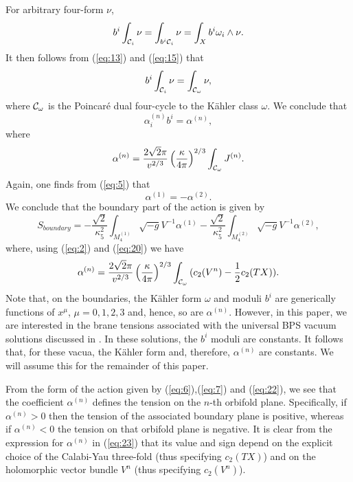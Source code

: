 \documentclass[a4paper,12pt]{article}
\numberwithin{equation}{section}
\theoremstyle{plain}
\begin{document}
For arbitrary four-form $\nu$,
%
\begin{equation}
b^{i}\int_{{\cal{C}}_{i}}{\nu}=\int_{b^{i}{\cal{C}}_{i}}{\nu}=\int_{X}{b^{i}
\omega_{i}\wedge \nu}.
\label{eq:17}
\end{equation}
%
It then follows from (\ref{eq:13}) and (\ref{eq:15}) that
%
\begin{equation}
b^{i}\int_{{\cal{C}}_{i}}{\nu}=\int_{{\cal{C}}_{\omega}}{\nu},
\label{eq:18}
\end{equation}
%
where ${\cal{C}}_{\omega}$ is the Poincar\'e dual four-cycle to the K\"{a}hler
class $\omega$. We conclude that
%
\begin{equation}
\alpha_{i}^{(n)}b^{i}=\alpha^{(n)},
\label{eq:19}
\end{equation}
%
where
%
\begin{equation}
\alpha^{(n)}=\frac{2\sqrt{2}\pi}{v^{2/3}}\left(\frac{\kappa}{4\pi}\right)^{2/3}
\int_{{\cal{C}}_{\omega}}{J^{(n)}}.
\label{eq:20}
\end{equation}
%
Again, one finds from (\ref{eq:5}) that
%
\begin{equation}
\alpha^{(1)}=-\alpha^{(2)}.
\label{eq:21}
\end{equation}
%
We conclude that the boundary part of the action is given by
%
\begin{equation}
S_{boundary}=-\frac{\sqrt{2}}{\kappa_{5}^{2}}\int_{M_{4}^{(1)}}{\sqrt{-g}V^{-1}
\alpha^{(1)}} - \frac{\sqrt{2}}{\kappa_{5}^{2}}\int_{M_{4}^{(2)}}
{\sqrt{-g}V^{-1}\alpha^{(2)}},
\label{eq:22}
\end{equation}
%
where, using (\ref{eq:2}) and (\ref{eq:20}) we have
%
\begin{equation}
\alpha^{(n)}=\frac{2\sqrt{2}\pi}{v^{2/3}}\left(\frac{\kappa}{4\pi}\right)^{2/3}
\int_{{\cal{C}}_{\omega}}{(c_{2}(V^{n})-\frac{1}{2}c_{2}(TX))}.
\label{eq:23}
\end{equation}
%
Note that, on the boundaries, the K\"{a}hler form $\omega$ and 
moduli $b^{i}$ are generically functions of $x^{\mu}$, $\mu=0,1,2,3$ and,
hence, so are $\alpha^{(n)}$. However, in this paper,
we are interested in the brane tensions associated with the universal BPS
vacuum solutions discussed in \cite{BW1B}. 
In these solutions, the $b^{i}$ moduli are
constants. It follows that, for these vacua, the K\"{a}hler form and, therefore, 
$\alpha^{(n)}$ are constants. We will assume this for the remainder of this
paper.

From the form of the action given by (\ref{eq:6}),(\ref{eq:7}) and
(\ref{eq:22}), we see that the coefficient $\alpha^{(n)}$ defines the tension on the
$n$-th orbifold plane. Specifically, if $\alpha^{(n)}>0$ then the tension of
the associated boundary plane is positive, whereas if $\alpha^{(n)}<0$ the
tension on that orbifold plane is negative. It is clear from the expression
for $\alpha^{(n)}$ in (\ref{eq:23}) that its value
and sign depend on the explicit choice of the Calabi-Yau three-fold (thus
specifying $c_{2}(TX)$) and on the holomorphic vector bundle $V^{n}$ (thus
specifying $c_{2}(V^{n})$). 
\end{document}
